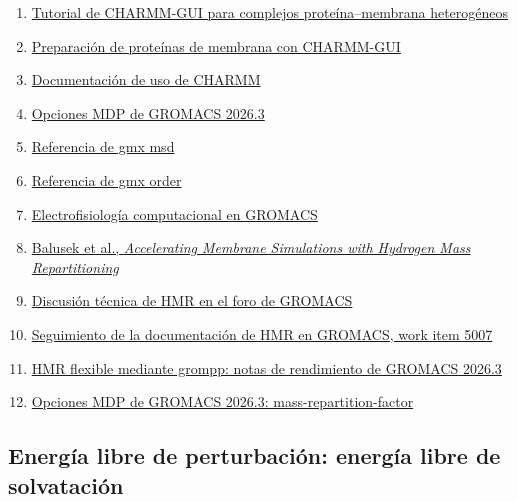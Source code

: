 \documentclass[
  spanish,
  11pt,
  a4paper]{article}
\providecommand{\tightlist}{%
  \setlength{\itemsep}{0pt}\setlength{\parskip}{0pt}}
\begin{document}
\begin{enumerate}
\def\labelenumi{\arabic{enumi}.}
\tightlist
\item
  \href{https://charmm-gui.org/?doc=tutorial&project=membrane&chapter=membrane_vdac_hetero}{Tutorial
  de CHARMM-GUI para complejos proteína--membrana heterogéneos}
\item
  \href{https://pmc.ncbi.nlm.nih.gov/articles/PMC8158057/}{Preparación
  de proteínas de membrana con CHARMM-GUI}
\item
  \href{https://www.charmm-gui.org/charmmdoc/usage.html}{Documentación
  de uso de CHARMM}
\item
  \href{https://manual.gromacs.org/current/user-guide/mdp-options.html}{Opciones
  MDP de GROMACS 2026.3}
\item
  \href{https://manual.gromacs.org/current/onlinehelp/gmx-msd.html}{Referencia
  de gmx msd}
\item
  \href{https://manual.gromacs.org/current/onlinehelp/gmx-order.html}{Referencia
  de gmx order}
\item
  \href{https://manual.gromacs.org/current/reference-manual/special/comp-electrophys.html}{Electrofisiología
  computacional en GROMACS}
\item
  \href{https://pmc.ncbi.nlm.nih.gov/articles/PMC7271963/}{Balusek et
  al., \emph{Accelerating Membrane Simulations with Hydrogen Mass
  Repartitioning}}
\item
  \href{https://gromacs.bioexcel.eu/t/hydrogen-mass-repartitioning/1171}{Discusión
  técnica de HMR en el foro de GROMACS}
\item
  \href{https://gitlab.com/gromacs/gromacs/-/work_items/5007}{Seguimiento
  de la documentación de HMR en GROMACS, work item 5007}
\item
  \href{https://manual.gromacs.org/2026.3/release-notes/2024/major/performance.html\#flexible-hydrogen-mass-repartitioning-using-grompp}{HMR
  flexible mediante grompp: notas de rendimiento de GROMACS 2026.3}
\item
  \href{https://manual.gromacs.org/2026.3/user-guide/mdp-options.html\#mdp-value-mass-repartition-factor}{Opciones
  MDP de GROMACS 2026.3: mass-repartition-factor}
\end{enumerate}

\subsection{Energía libre de perturbación: energía libre de
solvatación}\label{energuxeda-libre-de-perturbaciuxf3n-energuxeda-libre-de-solvataciuxf3n}
\end{document}

